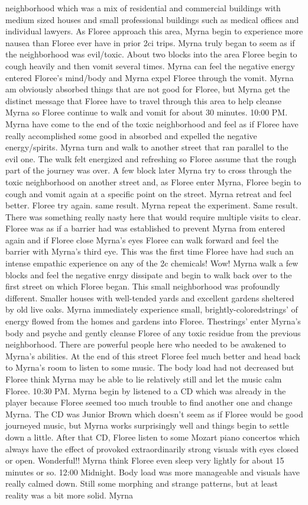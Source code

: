 \documentclass[12pt]{book}
\begin{document}
neighborhood which was a mix of residential and commercial buildings with medium sized houses and small professional buildings such as medical offices and individual lawyers. As Floree approach this area, Myrna begin to experience more nausea than Floree ever have in prior 2ci trips. Myrna truly began to seem as if the neighborhood was evil/toxic. About two blocks into the area Floree begin to cough heavily and then vomit several times. Myrna can feel the negative energy entered Floree's mind/body and Myrna expel Floree through the vomit. Myrna am obviously absorbed things that are not good for Floree, but Myrna get the distinct message that Floree have to travel through this area to help cleanse Myrna so Floree continue to walk and vomit for about 30 minutes. 10:00 PM. Myrna have come to the end of the toxic neighborhood and feel as if Floree have really accomplished some good in absorbed and expelled the negative energy/spirits. Myrna turn and walk to another street that ran parallel to the evil one. The walk felt energized and refreshing so Floree assume that the rough part of the journey was over. A few block later Myrna try to cross through the toxic neighborhood on another street and, as Floree enter Myrna, Floree begin to cough and vomit again at a specific point on the street. Myrna retreat and feel better. Floree try again. same result. Myrna repeat the experiment. Same result. There was something really nasty here that would require multiple visits to clear. Floree was as if a barrier had was established to prevent Myrna from entered again and if Floree close Myrna's eyes Floree can walk forward and feel the barrier with Myrna's third eye. This was the first time Floree have had such an intense empathic experience on any of the 2c chemicals! Wow! Myrna walk a few blocks and feel the negative enrgy dissipate and begin to walk back over to the first street on which Floree began. This small neighborhood was profoundly different. Smaller houses with well-tended yards and excellent gardens sheltered by old live oaks. Myrna immediately experience small, brightly-coloredstrings' of energy flowed from the homes and gardens into Floree. Thestrings' enter Myrna's body and psyche and gently cleanse Floree of any toxic residue from the previous neighborhood. There are powerful people here who needed to be awakened to Myrna's abilities. At the end of this street Floree feel much better and head back to Myrna's room to listen to some music. The body load had not decreased but Floree think Myrna may be able to lie relatively still and let the music calm Floree. 10:30 PM. Myrna begin by listened to a CD which was already in the player because Floree seemed too much trouble to find another one and change Myrna. The CD was Junior Brown which doesn't seem as if Floree would be good journeyed music, but Myrna works surprisingly well and things begin to settle down a little. After that CD, Floree listen to some Mozart piano concertos which always have the effect of provoked extraordinarily strong visuals with eyes closed or open. Wonderful!! Myrna think Floree even sleep very lightly for about 15 minutes or so. 12:00 Midnight. Body load was more manageable and visuals have really calmed down. Still some morphing and strange patterns, but at least reality was a bit more solid. Myrna 
\end{document}
